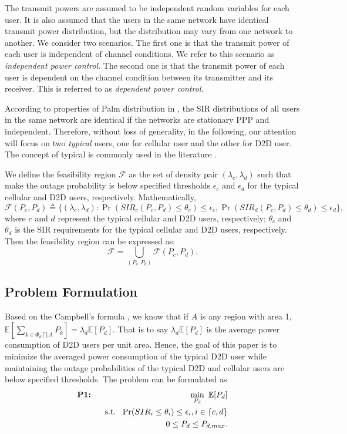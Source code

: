 \documentclass[12pt, draftclsnofoot, journal, letterpaper, onecolumn]{IEEEtran}
\begin{document}
The transmit powers are assumed to be independent random variables for each user. It is also assumed that the users in the same network have identical transmit power distribution, but the distribution may vary from one network to another.
We consider two scenarios. The first one is that the transmit power of each user is independent of channel conditions. We refer to this scenario as \emph{independent power control}. The second one is that the transmit power of each user is dependent on the channel condition between its transmitter and its receiver. This is referred to as \emph{dependent power control}.

According to properties of Palm distribution in \cite{SG}, the SIR distributions of all users in the same network are identical if the networks are stationary PPP and independent. Therefore, without loss of generality, in the following, our attention will focus on two \emph{typical} users, one for cellular user and the other for D2D user. The concept of typical is commonly used in the literature \cite{TC,TC2,OP}.

We define the feasibility region $\mathcal{F}$ as the set of density pair $(\lambda_c,\lambda_d)$ such that make the outage probability is below specified thresholds $\epsilon_c$ and $\epsilon_d$ for the typical cellular and D2D users, respectively. Mathematically,
\begin{equation*}
\mathcal{F}(P_c,P_d)\triangleq\big\{(\lambda_c,\lambda_d):\Pr(SIR_c(P_c,P_d)\leq\theta_c)\leq\epsilon_c,\Pr(SIR_{d}(P_c,P_d)\leq\theta_d)\leq\epsilon_d\big\},
\end{equation*}
where $c$ and $d$ represent the typical cellular and D2D users, respectively; $\theta_c$ and $\theta_d$ is the SIR requirements for the typical cellular and D2D users, respectively.
Then the feasibility region can be expressed as:
\begin{equation}\label{feasibilityregion}
\mathcal{F}=\bigcup_{(P_c,P_d)}\mathcal{F}(P_c,P_d).
\end{equation}

\subsection{Problem Formulation}


Based on the Campbell's formula \cite{SG}, we know that if $A$ is any region with area 1, $\mathbb{E}[\sum_{k\in\Phi_d\bigcap A}P_k]=\lambda_d\mathbb{E}[P_d]$. That is to say $\lambda_d\mathbb{E}[P_d]$ is the average power consumption of D2D users per unit area. Hence, the goal of this paper
is to minimize the averaged power consumption of the typical D2D user while maintaining the
outage probabilities of the typical D2D and cellular users are below specified thresholds. The
problem can be formulated as
\begin{eqnarray}\label{minpower}
  \textbf{P1:}~~ && \min_{P_d}~\mathbb{E}[P_d] \\
  &&{\rm s.t.}~~ \Pr(SIR_i\leq\theta_i) \leq \epsilon_i, i\in\{c,d\}\label{constrainc}\\
  && ~~~~~~~0\leq P_ d \leq P_{d,max}.\label{constraine}
\end{eqnarray}
\end{document}
